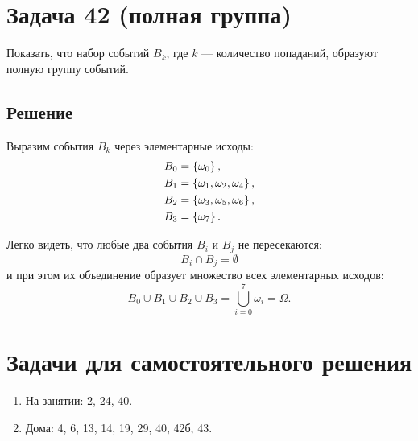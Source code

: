 \section*{Задача 42 (полная группа)}

Показать, что набор событий $B_k$, где $k$ --- количество попаданий, образуют полную группу событий.

\subsection*{Решение}

Выразим события $B_k$ через элементарные исходы:
\begin{align}
    B_0 & = \left \{  \omega_0  \right \}, \\
    B_1 & = \left \{  \omega_1, \omega_2, \omega_4  \right \}, \\
    B_2 & = \left \{  \omega_3, \omega_5, \omega_6  \right \}, \\
    B_3 & = \left \{  \omega_7  \right \}.
\end{align}

Легко видеть, что любые два события $B_i$ и $B_j$ не пересекаются:
\[
    B_i \cap B_j = \emptyset
\]
и при этом их объединение образует множество всех элементарных исходов:
\[
    B_0 \cup B_1 \cup B_2 \cup B_3 = \bigcup_{i=0}^7 \omega_i = \Omega .
\]

\section*{Задачи для самостоятельного решения}

\begin{enumerate}
    \item На занятии: 2, 24, 40.
    \item Дома: 4, 6, 13, 14, 19, 29, 40, 42б, 43.
\end{enumerate}